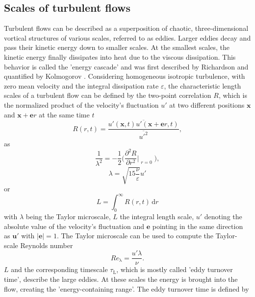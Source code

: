 \documentclass[11pt,a4paper,openany,oneside,parskip=half*]{article}
\renewcommand*\vec[1]{\boldsymbol{#1}}
\begin{document}
\subsection{Scales of turbulent flows}
Turbulent flows can be described as a superposition of chaotic, three-dimensional vortical structures of various scales, referred to as eddies. Larger eddies decay and pass their kinetic energy down to smaller scales. At the smallest scales, the kinetic energy finally dissipates into heat due to the viscous dissipation. This behavior is called the 'energy cascade' and was first described by Richardson \cite{Richardson1920} and quantified by Kolmogorov \cite{Kolmogorov1941}.
\newline
Considering homogeneous isotropic turbulence, with zero mean velocity and the integral dissipation rate $\varepsilon$, the characteristic length scales of a turbulent flow can be defined by the two-point correlation $R$, which is the normalized product of the velocity's fluctuation $u'$ at two different positions 
$\vec{x}$ and $\vec{x} + \vec{e}r$ at the same time $t$
\begin{equation}
R (r, t) = \frac{\overline{u'(\vec{x}, t)u'(\vec{x} + \vec{e}r, t)}}{\overline{u'^2}},
\end{equation}
as
\begin{equation}
 \frac{1}{\lambda^2} = -\frac{1}{2}\biggl(\frac{\partial^2 R}{\partial r^2}\Bigr|_{\substack{r=0}}\biggl),
\end{equation}
\begin{equation}
\lambda = \sqrt{15 \frac{\nu}{\varepsilon}} u'
\end{equation}
or
\begin{equation} \label{eq:integralLengthScale}
L = \int_{0}^{\infty} R (r, t)  \, \mathrm{d}r
\end{equation}
with $\lambda$ being the Taylor microscale, $L$ the integral length scale, $u'$ denoting the absolute value of the velocity's fluctuation and $\vec{e}$ pointing in the same direction as $\vec{u'}$ with $|\vec{e}| = 1$.
\newline
The Taylor microscale can be used to compute the Taylor-scale Reynolds number
\begin{equation}
Re_\mathrm{\lambda} = \frac{u' \lambda}{\nu}.
\end{equation}
\newline
$L$ and the corresponding timescale $\tau_\mathrm{L}$, which is mostly called 'eddy turnover time', describe the large eddies. At these scales the energy is brought into the flow, creating the 'energy-containing range'. The eddy turnover time is defined by
\end{document}
